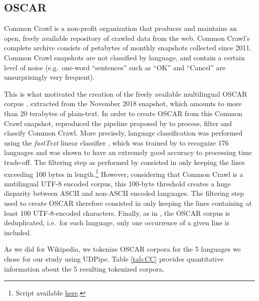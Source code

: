 \subsection{OSCAR}

Common Crawl is a non-profit organization that produces and maintains an open, freely available repository of crawled data from the web. Common Crawl's complete archive consists of petabytes of monthly snapshots collected since 2011. \iffalse The snapshots are distributed as raw HTML documents, or as \emph{WET} files which contain the extracted plain text converted to UTF-8, as well as a header containing the metadata of each extracted document.\fi{} Common Crawl snapshots are not classified by language, and contain a certain level of noise (e.g.~one-word ``sentences'' such as ``OK'' and ``Cancel'' are unsurprisingly very frequent).

This is what motivated the creation of the freely available multilingual OSCAR corpus \citep{ortiz-suarez-etal-2019-asynchronous}, extracted from the November 2018 snapshot, which amounts to more than 20 terabytes of plain-text. In order to create OSCAR from this Common Crawl snapshot, \citet{ortiz-suarez-etal-2019-asynchronous}  reproduced the pipeline proposed by \citep{grave-etal-2018-learning} to process, filter and classify Common Crawl. More precisely,  language classification was performed using the \emph{fastText} linear classifier \citep{joulin-etal-2016-fasttext,joulin-etal-2017-bag}, which was trained by \citet{grave-etal-2018-learning} to recognize 176 languages and was shown to have an extremely good accuracy to processing time trade-off. The filtering step as performed by \citet{grave-etal-2018-learning} consisted in only keeping the lines exceeding 100 bytes in length.\footnote{Script available \href{https://github.com/facebookresearch/fastText/blob/master/crawl/process_wet_file.sh}{here}.} However, considering that Common Crawl is a mutilingual UTF-8 encoded corpus, this 100-byte threshold creates a huge disparity between ASCII and non-ASCII encoded languages. The filtering step used to create OSCAR therefore consisted in only keeping the lines containing at least 100 UTF-8-encoded characters. Finally, as in  \citep{grave-etal-2018-learning}, the OSCAR corpus is deduplicated, i.e.~for each language, only one occurrence of a given line is included.

As we did for Wikipedia, we tokenize OSCAR corpora for the 5 languages we chose for our study using UDPipe. Table \ref{tab:CC} provides quantitative information about the 5 resulting tokenized corpora.

